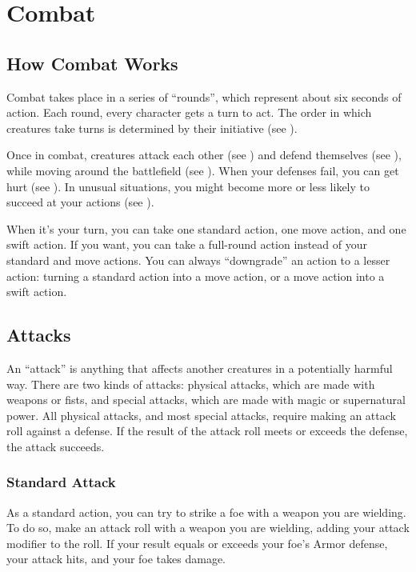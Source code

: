 \chapter{Combat}\label{Combat}

\section{How Combat Works}
Combat takes place in a series of ``rounds'', which represent about six seconds of action. Each round, every character gets a turn to act. The order in which creatures take turns is determined by their initiative (see ). 

Once in combat, creatures attack each other (see ) and defend themselves (see ), while moving around the battlefield (see ). When your defenses fail, you can get hurt (see ). In unusual situations, you might become more or less likely to succeed at your actions (see ).

When it's your turn, you can take one standard action, one move action, and one swift action. If you want, you can take a full-round action instead of your standard and move actions. You can always ``downgrade'' an action to a lesser action: turning a standard action into a move action, or a move action into a swift action.

\section{Attacks}\label{Attacks}
An ``attack'' is anything that affects another creatures in a potentially harmful way. There are two kinds of attacks: physical attacks, which are made with weapons or fists, and special attacks, which are made with magic or supernatural power. All physical attacks, and most special attacks, require making an attack roll against a defense. If the result of the attack roll meets or exceeds the defense, the attack succeeds.

\subsection{Standard Attack}
As a standard action, you can try to strike a foe with a weapon you are wielding. To do so, make an attack roll with a weapon you are wielding, adding your attack modifier to the roll. If your result equals or exceeds your foe's Armor defense, your attack hits, and your foe takes damage.


